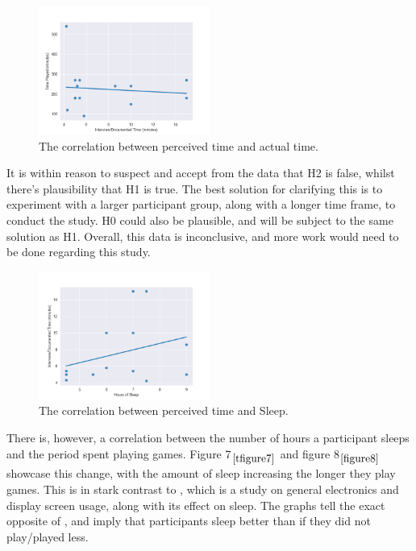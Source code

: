 \documentclass[conference]{IEEEtran}
\begin{document}
\begin{figure}[H]
\includegraphics[width = 0.5\textwidth]{Graph1}
\caption{The correlation between perceived time and actual time.}
\label{figure6}
\end{figure}

It is within reason to suspect and accept from the data that H2 is false, whilst there’s plausibility that H1 is true. The best solution for clarifying this is to experiment with a larger participant group, along with a longer time frame, to conduct the study. H0 could also be plausible, and will be subject to the same solution as H1. Overall, this data is inconclusive, and more work would need to be done regarding this study.

\begin{figure}[H]
\includegraphics[width = 0.5\textwidth]{Graph2}
\caption{The correlation between perceived time and Sleep.}
\label{figure7}
\end{figure}

There is, however, a correlation between the number of hours a participant sleeps and the period spent playing games. Figure 7$_{\ref{tfigure7}}$ and figure 8$_{\ref{figure8}}$ showcase this change, with the amount of sleep increasing the longer they play games. This is in stark contrast to \cite{Yamazaki2022}, which is a study on general electronics and display screen usage, along with its effect on sleep. The graphs tell the exact opposite of \cite{Yamazaki2022}, and imply that participants sleep better than if they did not play/played less.
\end{document}

